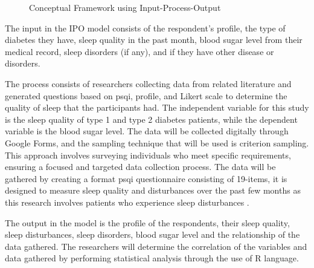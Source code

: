 \begin{figure}[h]
  \caption{Conceptual Framework using Input-Process-Output}
  \label{fig:conceptual_framework}
\end{figure}


The input in the IPO model consists of the respondent's profile, the type of
diabetes they have, sleep quality in the past month, blood sugar level from
their medical record, sleep disorders (if any), and if they have other disease
or disorders.

The process consists of researchers collecting data from related literature and
generated questions based on \ac{psqi}, profile, and Likert scale to determine
the quality of sleep that the participants had. The independent variable for
this study is the sleep quality of type 1 and type 2 diabetes patients, while
the dependent variable is the blood sugar level. The data will be collected
digitally through Google Forms, and the sampling technique that will be used is
criterion sampling. This approach involves surveying individuals who meet
specific requirements, ensuring a focused and targeted data collection process.
The data will be gathered by creating a format \ac{psqi} questionnaire
consisting of 19-items, it is designed to measure sleep quality and disturbances
over the past few months as this research involves patients who experience sleep
disturbances \parencite{zhong-2015}.

The output in the model is the profile of the respondents, their sleep quality,
sleep disturbances, sleep disorders, blood sugar level and the relationship of
the data gathered. The researchers will determine the correlation of the
variables and data gathered by performing statistical analysis through the use
of R language.
